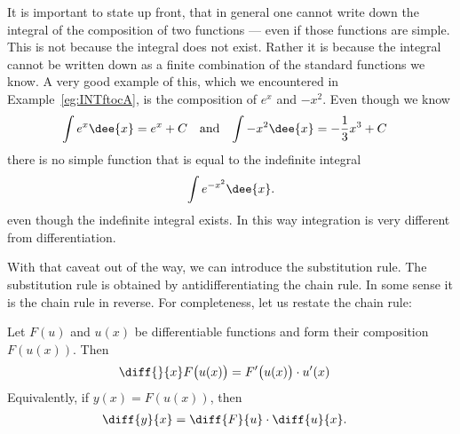 It is important to state up front, that in general one cannot write down the integral of
the composition of two functions --- even if those functions are simple. This is not
because the integral does not exist. Rather it is because the integral cannot be written
down as a finite combination of the standard functions we know. A very good example of
this, which we encountered in Example~\ref{eg:INTftocA}, is the composition of $e^x$ and
$-x^2$. Even though we know
\begin{align*}
  \int e^x \dee{x} &= e^x+C & \text{and}&&
  \int -x^2 \dee{x} &= -\frac13 x^3 +C
\end{align*}
there is no simple function that is equal to the indefinite integral
\begin{align*}
\int e^{-x^2}\dee{x}.
\end{align*}
even though the indefinite integral exists. In this way integration is very different
from differentiation.

With that caveat out of the way, we can introduce the substitution rule. The substitution
rule is obtained by antidifferentiating the chain rule. In some sense it is the chain
rule
in reverse. For completeness, let us restate the chain rule:
\begin{theorem}
  Let $F(u)$ and $u(x)$ be differentiable functions and form their composition $F(u(x))$.
Then
  \begin{align*}
  \diff{}{x} F\big( u( x) \big) &= F'\big(u(x)\big) \cdot u'(x)
\end{align*}
Equivalently, if $y(x)=F(u(x))$, then
\begin{align*}
  \diff{y}{x} &= \diff{F}{u} \cdot \diff{u}{x}.
\end{align*}
\end{theorem}



